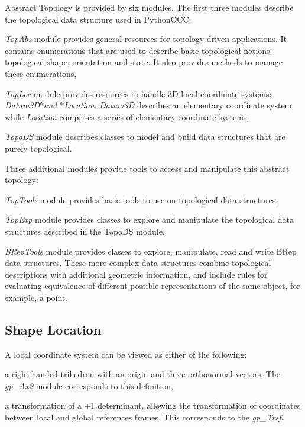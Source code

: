 Abstract Topology is provided by six modules. The first three modules describe the topological data structure used in Python\+O\+CC\+:


\begin{DoxyItemize}
\item {\itshape Top\+Abs} module provides general resources for topology-\/driven applications. It contains enumerations that are used to describe basic topological notions\+: topological shape, orientation and state. It also provides methods to manage these enumerations,
\item {\itshape Top\+Loc} module provides resources to handle 3D local coordinate systems\+: {\itshape Datum3\+D$\ast$and $\ast$\+Location}. {\itshape Datum3D} describes an elementary coordinate system, while {\itshape Location} comprises a series of elementary coordinate systems,
\item {\itshape Topo\+DS} module describes classes to model and build data structures that are purely topological.
\end{DoxyItemize}

Three additional modules provide tools to access and manipulate this abstract topology\+:


\begin{DoxyItemize}
\item {\itshape Top\+Tools} module provides basic tools to use on topological data structures,
\item {\itshape Top\+Exp} module provides classes to explore and manipulate the topological data structures described in the Topo\+DS module,
\item {\itshape B\+Rep\+Tools} module provides classes to explore, manipulate, read and write B\+Rep data structures. These more complex data structures combine topological descriptions with additional geometric information, and include rules for evaluating equivalence of different possible representations of the same object, for example, a point.
\end{DoxyItemize}\hypertarget{occt_user_guides__modeling_data_occt_modat_5_1}{}\subsection{Shape Location}\label{occt_user_guides__modeling_data_occt_modat_5_1}
A local coordinate system can be viewed as either of the following\+:
\begin{DoxyItemize}
\item a right-\/handed trihedron with an origin and three orthonormal vectors. The {\itshape gp\+\_\+\+Ax2} module corresponds to this definition,
\item a transformation of a +1 determinant, allowing the transformation of coordinates between local and global references frames. This corresponds to the {\itshape gp\+\_\+\+Trsf}.
\end{DoxyItemize}

